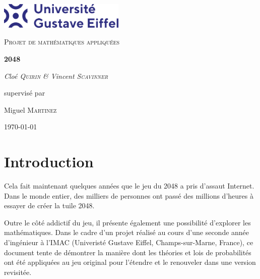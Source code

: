 \documentclass[a4paper, 12pt]{report}
\begin{document}
\begin{titlepage}

\centering

\includegraphics[width=0.45\textwidth]{../images/gustave-eiffel-university.png}\par\vspace{1cm}

{\scshape\Large Projet de mathématiques appliquées\par}

\vspace{1.5cm}

{\huge\bfseries 2048\par}

\vspace{2cm}

{\Large\itshape Cloé \textsc{Quirin} \& Vincent \textsc{Scavinner}\par}

\vfill
supervisé par\par
Miguel \textsc{Martinez}
\vfill

{\large \today\par}

\end{titlepage}

\begin{abstract}
Rapport de projet documentant la réflexion et les choix d'implémentation réalisés dans le cadre de la conception d'une version revisitée du jeu 2048, utilisant des lois de probabilités mathématiques. 
Le code source du projet est disponible à l'adresse suivante : \href{https://github.com/vscav/2048}{https://github.com/vscav/2048}.
\end{abstract}

\tableofcontents

\chapter{Introduction}

\tabto{1cm}Cela fait maintenant quelques années que le jeu du 2048 a pris d'assaut Internet.
Dans le monde entier, des milliers de personnes ont passé des millions d'heures à
essayer de créer la tuile 2048.

\vspace{0.5cm}

\tabto{1cm}Outre le côté addictif du jeu, il présente également une possibilité
d'explorer les mathématiques. Dans le cadre d'un projet réalisé au cours d'une seconde année d'ingénieur
à l'IMAC (Univeristé Gustave Eiffel, Champs-sur-Marne, France), ce document tente de
démontrer la manière dont les théories et lois de probabilités ont été appliquées au jeu
original pour l'étendre et le renouveler dans une version revisitée.
\end{document}
